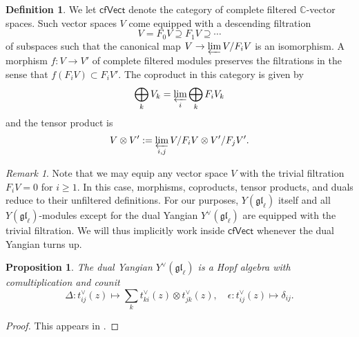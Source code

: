 \documentclass[11pt]{report}
\newtheorem{prop}[theorem]{Proposition}
\theoremstyle{definition}
\newtheorem{definition}[theorem]{Definition}
\theoremstyle{remark}
\newtheorem*{remark}{Remark}
\theoremstyle{remark}
\newcommand{\C}{\mathbb{C}}
\begin{document}
\begin{definition}\label{definition:cfVect}
We let $\mathsf{cfVect}$ denote the category of complete filtered $\C$-vector spaces. Such vector spaces $V$ come equipped with a descending filtration
\begin{equation*}
V = F_0 V \supseteq F_1 V \supseteq \cdots
\end{equation*}
of subspaces such that the canonical map $V \to \varprojlim V/F_i V$ is an isomorphism. A morphism $f: V \to V'$ of complete filtered modules preserves the filtrations in the sense that $f(F_i V) \subset F_i V'$. The coproduct in this category is given by
\begin{equation*}
\bigoplus_k V_k = \varprojlim_i \bigoplus_k F_i V_k
\end{equation*}
and the tensor product is
\begin{equation*}
V \otimes V' := \varprojlim_{i,j} V/F_i V \otimes V'/F_j V'.
\end{equation*}
\end{definition}

\begin{remark}
Note that we may equip any vector space $V$ with the trivial filtration $F_i V = 0$ for $i \geq 1$. In this case, morphisms, coproducts, tensor products, and duals reduce to their unfiltered definitions. For our purposes, $Y(\mathfrak{gl}_\ell)$ itself and all $Y(\mathfrak{gl}_\ell)$-modules except for the dual Yangian $Y^\vee(\mathfrak{gl}_\ell)$ are equipped with the trivial filtration. We will thus implicitly work inside $\mathsf{cfVect}$ whenever the dual Yangian turns up.
\end{remark}

\begin{prop}
The dual Yangian $Y^\vee(\mathfrak{gl}_\ell)$ is a Hopf algebra with comultiplication and counit
\begin{equation*}
\Delta: t_{ij}^\vee(z) \mapsto \sum_k t_{ki}^\vee(z) \otimes t_{jk}^\vee(z), \quad \epsilon: t_{ij}^\vee(z) \mapsto \delta_{ij}.
\end{equation*}
\end{prop}

\begin{proof}
This appears in \cite{article:nazarov:2019}.
\end{proof}
\end{document}
